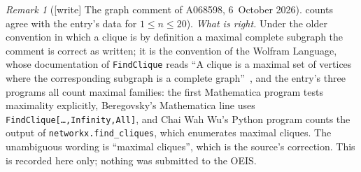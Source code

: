 \documentclass[11pt,letterpaper]{article}
\numberwithin{equation}{section}
\theoremstyle{remark}\newtheorem{remark}[theorem]{Remark}
\begin{document}
\begin{remark}[{[write]} The graph comment of A068598, 6~October 2026]
counts agree with the entry's data for $1\le n\le20$). \emph{What is right.}
Under the older convention in which a clique is by definition a maximal
complete subgraph the comment is correct as written; it is the convention
of the Wolfram Language, whose documentation of \texttt{FindClique} reads ``A
clique is a maximal set of vertices where the corresponding subgraph is a
complete graph''~\cite{findclique}, and the entry's three programs all
count maximal families: the first Mathematica program tests maximality
explicitly, Beregovsky's Mathematica line uses
\texttt{FindClique[\dots,Infinity,All]}, and Chai Wah Wu's Python program
counts the output of \texttt{networkx.find\_cliques}, which enumerates
maximal cliques. The unambiguous wording is ``maximal cliques'', which is
the source's correction. This is recorded here only; nothing was submitted
to the OEIS.
\end{remark}
\end{document}
